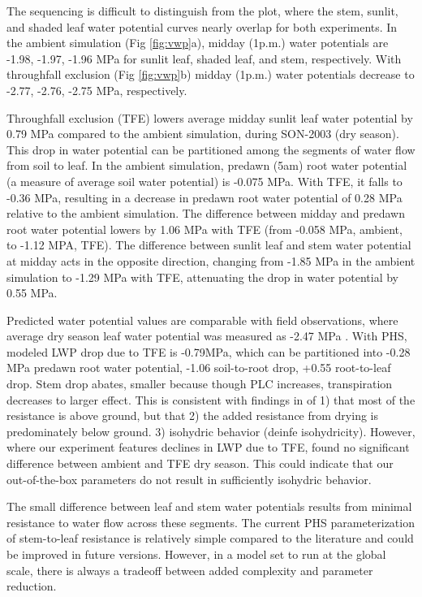 \documentclass[draft,linenumbers]{agujournal}
\begin{document}
The sequencing is difficult to distinguish from the plot, where the stem, sunlit, and shaded leaf water potential curves nearly overlap for both experiments. 
In the ambient simulation (Fig \ref{fig:vwp}a), midday (1p.m.) water potentials are -1.98, -1.97, -1.96 MPa 
for sunlit leaf, shaded leaf, and stem, respectively.
With throughfall exclusion (Fig \ref{fig:vwp}b) midday (1p.m.) water potentials decrease to -2.77, -2.76, -2.75 MPa, respectively.


Throughfall exclusion (TFE) lowers average midday sunlit leaf water potential by 0.79 MPa compared to the ambient simulation, during SON-2003 (dry season).
This drop in water potential can be partitioned among the segments of water flow from soil to leaf.
In the ambient simulation, predawn (5am) root water potential (a measure of average soil water potential) is -0.075 MPa. 
With TFE, it falls to -0.36 MPa, resulting in a decrease in predawn root water potential of 0.28 MPa relative to the ambient simulation. 
The difference between midday and predawn root water potential lowers by 1.06 MPa with TFE 
(from -0.058 MPa, ambient, to -1.12 MPA, TFE).
The difference between sunlit leaf and stem water potential at midday acts in the opposite direction, changing from
-1.85 MPa in the ambient simulation to -1.29 MPa with TFE, attenuating the drop in water potential by 0.55 MPa.

Predicted water potential values are comparable with field observations, where average dry season leaf water potential was measured as -2.47 MPa \citep{fisher2006}.
With PHS, modeled LWP drop due to TFE is -0.79MPa, which can be partitioned into -0.28 MPa predawn root water potential, -1.06 soil-to-root drop, +0.55 root-to-leaf drop.
Stem drop abates, smaller because though PLC increases, transpiration decreases to larger effect.
This is consistent with findings in \cite{fisher2006} of 
1) that most of the resistance is above ground, but that
2) the added resistance from drying is predominately below ground.
3) isohydric behavior (deinfe isohydricity).
However, where our experiment features declines in LWP due to TFE, \cite{fisher2006} found no significant difference between ambient and TFE dry season.
This could indicate that our out-of-the-box parameters do not result in sufficiently isohydric behavior.

The small difference between leaf and stem water potentials results from minimal resistance to water flow across these segments. 
The current PHS parameterization of stem-to-leaf resistance is relatively simple compared to the literature \citep{franks2007} and could be improved in future versions. 
However, in a model set to run at the global scale, there is always a tradeoff between added complexity and parameter reduction.
\end{document}
